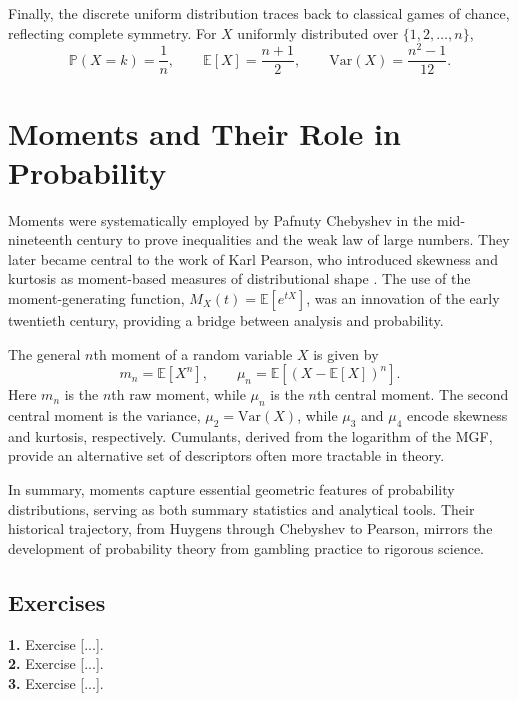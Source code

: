 \documentclass{book}
\begin{document}
Finally, the discrete uniform distribution traces back to classical games of chance, reflecting complete symmetry. For $X$ uniformly distributed over $\{1,2,\ldots,n\}$,
\[
\mathbb{P}(X=k)=\frac{1}{n}, \qquad
\mathbb{E}[X]=\frac{n+1}{2}, \qquad
\mathrm{Var}(X)=\frac{n^2-1}{12}.
\]

\section{Moments and Their Role in Probability}

Moments were systematically employed by Pafnuty Chebyshev in the mid-nineteenth century to prove inequalities and the weak law of large numbers. They later became central to the work of Karl Pearson, who introduced skewness and kurtosis as moment-based measures of distributional shape \cite{pearson-skewness}. The use of the moment-generating function, $M_X(t) = \mathbb{E}[e^{tX}]$, was an innovation of the early twentieth century, providing a bridge between analysis and probability.

The general $n$th moment of a random variable $X$ is given by
\[
m_n = \mathbb{E}[X^n], \qquad
\mu_n = \mathbb{E}[(X-\mathbb{E}[X])^n].
\]
Here $m_n$ is the $n$th raw moment, while $\mu_n$ is the $n$th central moment. The second central moment is the variance, $\mu_2 = \mathrm{Var}(X)$, while $\mu_3$ and $\mu_4$ encode skewness and kurtosis, respectively. Cumulants, derived from the logarithm of the MGF, provide an alternative set of descriptors often more tractable in theory.

In summary, moments capture essential geometric features of probability distributions, serving as both summary statistics and analytical tools. Their historical trajectory, from Huygens through Chebyshev to Pearson, mirrors the development of probability theory from gambling practice to rigorous science.

\newpage

\subsection*{Exercises}

\textbf{1.} Exercise [...].\\

\textbf{2.} Exercise [...].\\

\textbf{3.} Exercise [...].\\

\newpage
\end{document}
